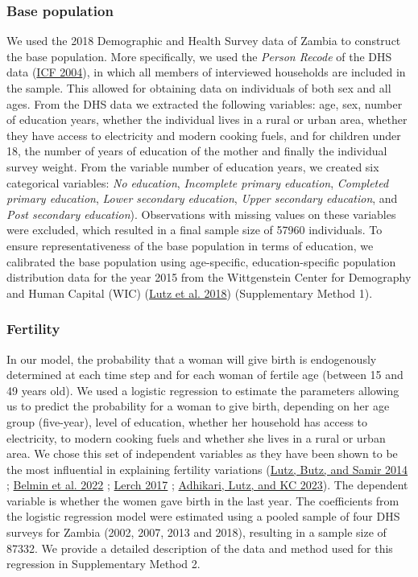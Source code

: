 \documentclass[
]{article}
\begin{document}
\hypertarget{base-population}{%
\subsubsection{Base population}\label{base-population}}

We used the 2018 Demographic and Health Survey data of Zambia to construct the base population. More specifically, we used the \emph{Person Recode} of the DHS data (\protect\hyperlink{ref-icf_demographic_2004}{ICF 2004}), in which all members of interviewed households are included in the sample. This allowed for obtaining data on individuals of both sex and all ages. From the DHS data we extracted the following variables: age, sex, number of education years, whether the individual lives in a rural or urban area, whether they have access to electricity and modern cooking fuels, and for children under 18, the number of years of education of the mother and finally the individual survey weight. From the variable number of education years, we created six categorical variables: \emph{No education}, \emph{Incomplete primary education}, \emph{Completed primary education}, \emph{Lower secondary education}, \emph{Upper secondary education}, and \emph{Post secondary education}). Observations with missing values on these variables were excluded, which resulted in a final sample size of 57960 individuals. To ensure representativeness of the base population in terms of education, we calibrated the base population using age-specific, education-specific population distribution data for the year 2015 from the Wittgenstein Center for Demography and Human Capital (WIC) (\protect\hyperlink{ref-lutz_demographic_2018}{Lutz et al. 2018}) (Supplementary Method 1).

\hypertarget{fertility}{%
\subsubsection{Fertility}\label{fertility}}

In our model, the probability that a woman will give birth is endogenously determined at each time step and for each woman of fertile age (between 15 and 49 years old). We used a logistic regression to estimate the parameters allowing us to predict the probability for a woman to give birth, depending on her age group (five-year), level of education, whether her household has access to electricity, to modern cooking fuels and whether she lives in a rural or urban area. We chose this set of independent variables as they have been shown to be the most influential in explaining fertility variations (\protect\hyperlink{ref-lutz_world_2014}{Lutz, Butz, and Samir 2014} ; \protect\hyperlink{ref-belmin_fertility_2022}{Belmin et al. 2022} ; \protect\hyperlink{ref-lerch_urban_2017}{Lerch 2017} ; \protect\hyperlink{ref-adhikari_ruralurban_2023}{Adhikari, Lutz, and KC 2023}). The dependent variable is whether the women gave birth in the last year. The coefficients from the logistic regression model were estimated using a pooled sample of four DHS surveys for Zambia (2002, 2007, 2013 and 2018), resulting in a sample size of 87332. We provide a detailed description of the data and method used for this regression in Supplementary Method 2.
\end{document}
